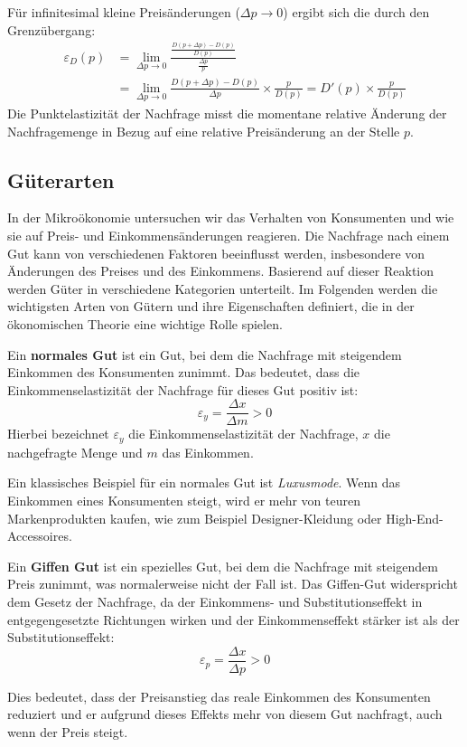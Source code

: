 Für infinitesimal kleine Preisänderungen (\(\Delta p \to 0\)) ergibt sich die  durch den Grenzübergang:
\begin{align*}
	\varepsilon_D(p) & = \lim_{\Delta p \to 0} \frac{\frac{D(p + \Delta p)-D(p)}{D(p)}}{\frac{\Delta p}{p}} \\ &= \lim_{\Delta p \to 0} \frac{D(p+\Delta p) - D(p)}{\Delta p} \times \frac{p}{D(p)}
	= D'(p) \times \frac{p}{D(p)}
\end{align*}
Die Punktelastizität der Nachfrage misst die momentane relative Änderung der Nachfragemenge in Bezug auf eine relative Preisänderung an der Stelle \(p\).

\subsection{Güterarten}
In der Mikroökonomie untersuchen wir das Verhalten von Konsumenten und wie sie auf Preis- und Einkommensänderungen reagieren. Die Nachfrage nach einem Gut kann von verschiedenen Faktoren beeinflusst werden, insbesondere von Änderungen des Preises und des Einkommens. Basierend auf dieser Reaktion werden Güter in verschiedene Kategorien unterteilt. Im Folgenden werden die wichtigsten Arten von Gütern und ihre Eigenschaften definiert, die in der ökonomischen Theorie eine wichtige Rolle spielen.

\begin{definition}
	Ein \textbf{normales Gut} ist ein Gut, bei dem die Nachfrage mit steigendem Einkommen des Konsumenten zunimmt. Das bedeutet, dass die Einkommenselastizität der Nachfrage für dieses Gut positiv ist:
	\[
		\varepsilon_y = \frac{\Delta x}{\Delta m} > 0
	\]
	Hierbei bezeichnet \( \varepsilon_y \) die Einkommenselastizität der Nachfrage, \( x \) die nachgefragte Menge und \( m \) das Einkommen.
\end{definition}

\begin{example}
	Ein klassisches Beispiel für ein normales Gut ist \textit{Luxusmode}. Wenn das Einkommen eines Konsumenten steigt, wird er mehr von teuren Markenprodukten kaufen, wie zum Beispiel Designer-Kleidung oder High-End-Accessoires.
\end{example}


\begin{definition}
	Ein \textbf{Giffen Gut} ist ein spezielles Gut, bei dem die Nachfrage mit steigendem Preis zunimmt, was normalerweise nicht der Fall ist. Das Giffen-Gut widerspricht dem Gesetz der Nachfrage, da der Einkommens- und Substitutionseffekt in entgegengesetzte Richtungen wirken und der Einkommenseffekt stärker ist als der Substitutionseffekt:
	\[
		\varepsilon_p = \frac{\Delta x}{\Delta p} > 0
	\]
\end{definition}
Dies bedeutet, dass der Preisanstieg das reale Einkommen des Konsumenten reduziert und er aufgrund dieses Effekts mehr von diesem Gut nachfragt, auch wenn der Preis steigt.

